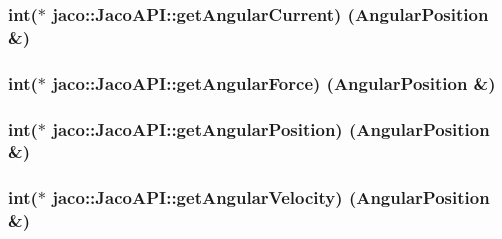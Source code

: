 \subsubsection[{\texorpdfstring{get\+Angular\+Current}{getAngularCurrent}}]{\setlength{\rightskip}{0pt plus 5cm}int($\ast$ jaco\+::\+Jaco\+A\+P\+I\+::get\+Angular\+Current) ({\bf Angular\+Position} \&)}\hypertarget{classjaco_1_1_jaco_a_p_i_ac24c226ba8ee3b72618a84eaab9d722a}{}\label{classjaco_1_1_jaco_a_p_i_ac24c226ba8ee3b72618a84eaab9d722a}
\subsubsection[{\texorpdfstring{get\+Angular\+Force}{getAngularForce}}]{\setlength{\rightskip}{0pt plus 5cm}int($\ast$ jaco\+::\+Jaco\+A\+P\+I\+::get\+Angular\+Force) ({\bf Angular\+Position} \&)}\hypertarget{classjaco_1_1_jaco_a_p_i_aea22577840f066fb2d5da409e50f9760}{}\label{classjaco_1_1_jaco_a_p_i_aea22577840f066fb2d5da409e50f9760}
\subsubsection[{\texorpdfstring{get\+Angular\+Position}{getAngularPosition}}]{\setlength{\rightskip}{0pt plus 5cm}int($\ast$ jaco\+::\+Jaco\+A\+P\+I\+::get\+Angular\+Position) ({\bf Angular\+Position} \&)}\hypertarget{classjaco_1_1_jaco_a_p_i_a8d2e9b00c5953e3fc024f86e128f01df}{}\label{classjaco_1_1_jaco_a_p_i_a8d2e9b00c5953e3fc024f86e128f01df}
\subsubsection[{\texorpdfstring{get\+Angular\+Velocity}{getAngularVelocity}}]{\setlength{\rightskip}{0pt plus 5cm}int($\ast$ jaco\+::\+Jaco\+A\+P\+I\+::get\+Angular\+Velocity) ({\bf Angular\+Position} \&)}\hypertarget{classjaco_1_1_jaco_a_p_i_af50f11de8f7c2b661f53d76f576eb3ae}{}\label{classjaco_1_1_jaco_a_p_i_af50f11de8f7c2b661f53d76f576eb3ae}
